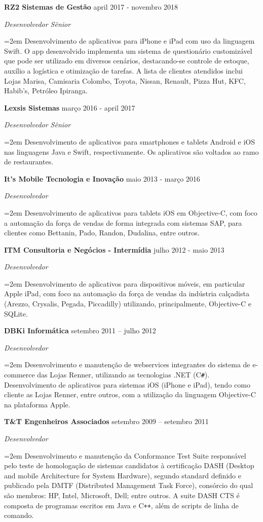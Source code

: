\documentclass[paper=a4,fontsize=11pt]{scrartcl} %
\newcommand{\sepspace}{\vspace*{1em}}		%
\newcommand{\EducationEntry}[4]{
		\noindent \textbf{#1} \hfill      %
        #2 \par
		\noindent \textit{#3} \par        %
		\noindent\hangindent=2em\hangafter=0 \small #4 %
		\normalsize \par}
\newcommand{\WorkEntry}[4]{				  %
		\noindent \textbf{#1} \hfill      %
        #2 \par
		\noindent \textit{#3} \par        %
		\noindent\hangindent=2em\hangafter=0 \small #4 %
		\normalsize \par}
\begin{document}
\WorkEntry{RZ2 Sistemas de Gestão}{april 2017 - novembro 2018}{Desenvolvedor Sênior}{Desenvolvimento de aplicativos para iPhone e iPad com uso da linguagem Swift. O app desenvolvido implementa um sistema de questionário customizável que pode ser utilizado em diversos cenários, destacando-se controle de estoque, auxílio a logística e otimização de tarefas. A lista de clientes atendidos inclui Lojas Marisa, Camisaria Colombo, Toyota, Nissan, Renault, Pizza Hut, KFC, Habib’s, Petróleo Ipiranga.}
\sepspace
\sepspace

\WorkEntry{Lexsis Sistemas}{março 2016 - april 2017}{Desenvolvedor Sênior}{Desenvolvimento de aplicativos para smartphones e tablets Android e iOS nas linguagens Java e Swift, respectivamente. Os aplicativos são voltados ao ramo de restaurantes.}
\sepspace
\sepspace

\WorkEntry{It’s Mobile Tecnologia e Inovação}{maio 2013 - março 2016}{Desenvolvedor}{Desenvolvimento de aplicativos para tablets iOS em Objective-C, com foco a automação da força de vendas de forma integrada com sistemas SAP, para clientes como Bettanin, Pado, Randon, Dudalina, entre outros.}

\newpage

\WorkEntry{ITM Consultoria e Negócios - Intermídia}{julho 2012 - maio 2013}{Desenvolvedor}{Desenvolvimento de aplicativos para dispositivos móveis, em particular Apple iPad, com foco na automação da força de vendas da indústria calçadista (Arezzo, Crysalis, Pegada, Piccadilly) utilizando, principalmente, Objective-C e SQLite.}
\sepspace
\sepspace

\WorkEntry{DBKi Informática}{setembro 2011 – julho 2012}{Desenvolvedor}{Desenvolvimento e manutenção de webservices integrantes do sistema de e-commerce das Lojas Renner, utilizando as tecnologias .NET (C\texttt{\#}). Desenvolvimento de aplicativos para sistemas iOS (iPhone e iPad), tendo como cliente as Lojas Renner, entre outros, com a utilização da linguagem Objective-C na plataforma Apple.}
\sepspace
\sepspace

\WorkEntry{T\&T Engenheiros Associados}{setembro 2009 – setembro 2011}{Desenvolvedor}{Desenvolvimento e manutenção da Conformance Test Suite responsável pelo teste de homologação de sistemas candidatos à certificação DASH (Desktop and mobile Architecture for System Hardware), segundo standard definido e publicado pela DMTF (Distributed Management Task Force), consórcio do qual são membros: HP, Intel, Microsoft, Dell; entre outros. A suite DASH CTS é composta de programas escritos em Java e C\texttt{++}, além de scripts de linha de comando.}
\sepspace
\sepspace
\end{document}
